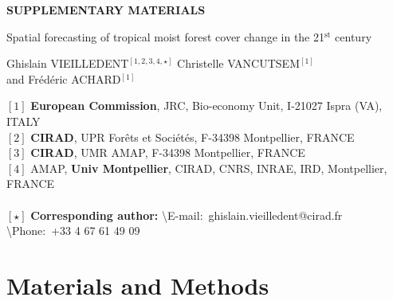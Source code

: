 \documentclass[12pt,]{article}
\author{}
\date{\vspace{-2.5em}}
\begin{document}
\renewcommand{\bibsection}{}  %

\begin{center}
  \Large{\textbf{SUPPLEMENTARY MATERIALS}}
\end{center}

\vspace{1cm}

\begin{center}
  \LARGE{Spatial forecasting of tropical moist forest cover change in the 21$^{\text{st}}$ century}
\end{center}

\vspace{1cm}

\begin{center}
  \large{
  Ghislain VIEILLEDENT$^{[1, 2, 3, 4, \star]}$ \hspace{0.5cm} Christelle VANCUTSEM$^{[1]}$\\
  \vspace{0.5cm}
  and \hspace{0.5cm} Frédéric ACHARD$^{[1]}$
  }
\end{center}

\vspace{1cm}

{\small
  \begin{flushleft}  
    $[1]$ \textbf{European Commission}, JRC, Bio-economy Unit, I-21027 Ispra (VA), ITALY\\
    $[2]$ \textbf{CIRAD}, UPR Forêts et Sociétés, F-34398 Montpellier, FRANCE\\
    $[3]$ \textbf{CIRAD}, UMR AMAP, F-34398 Montpellier, FRANCE\\
    $[4]$ AMAP, \textbf{Univ Montpellier}, CIRAD, CNRS, INRAE, IRD, Montpellier, FRANCE\\
    ~\\
    $[\star]$ \textbf{Corresponding author:}
    \textbackslash{E-mail}:~ghislain.vieilledent@cirad.fr
    \textbackslash{Phone}:~+33 4 67 61 49 09\\
  \end{flushleft}}

\newpage

\newpage

\hypertarget{materials-and-methods}{%
\section{Materials and Methods}\label{materials-and-methods}}
\end{document}
